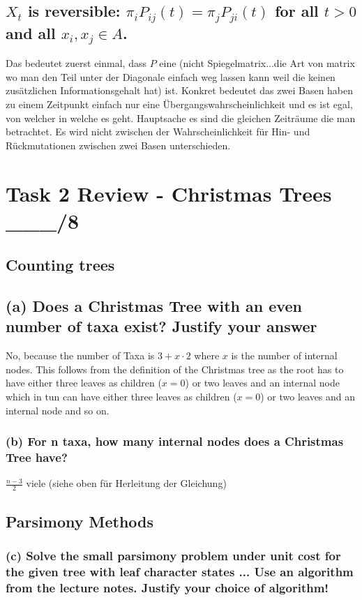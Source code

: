 \subsection{$X_t$ is reversible: $\pi_i P_{ij} (t) = \pi_j P_{ji} (t)$ for all $t > 0$ and all $x_i , x_j \in A$.}
Das bedeutet zuerst einmal, dass $P$ eine (nicht Spiegelmatrix...die Art von matrix wo man den Teil unter der Diagonale einfach weg lassen kann weil die keinen zusätzlichen Informationsgehalt hat) ist. Konkret bedeutet das zwei Basen haben zu einem Zeitpunkt einfach nur eine Übergangswahrscheinlichkeit und es ist egal, von welcher in welche es geht. Hauptsache es sind die gleichen Zeiträume die man betrachtet. Es wird nicht zwischen der Wahrscheinlichkeit für Hin- und Rückmutationen zwischen zwei Basen unterschieden. 

\section*{Task 2 Review - Christmas Trees \_\_\_/8}
\subsection*{Counting trees}
\subsection*{(a) Does a Christmas Tree with an even number of taxa exist? Justify your answer}
No, because the number of Taxa is $3+x\cdot2$ where $x$ is the number of internal nodes. This follows from the definition of the Christmas tree as the root has to have either three leaves as children ($x=0$) or two leaves and an internal node which in tun can have either three leaves as children ($x=0$) or two leaves and an internal node and so on.  

\subsubsection*{(b) For n taxa, how many internal nodes does a Christmas Tree have?}

\(
\frac{n-3}{2}
\) viele (siehe oben für Herleitung der Gleichung)
 

\subsection*{Parsimony Methods}
\subsubsection*{(c) Solve the small parsimony problem under unit cost for the given tree with leaf character states ... Use an algorithm from the lecture notes. Justify your choice of algorithm!}

